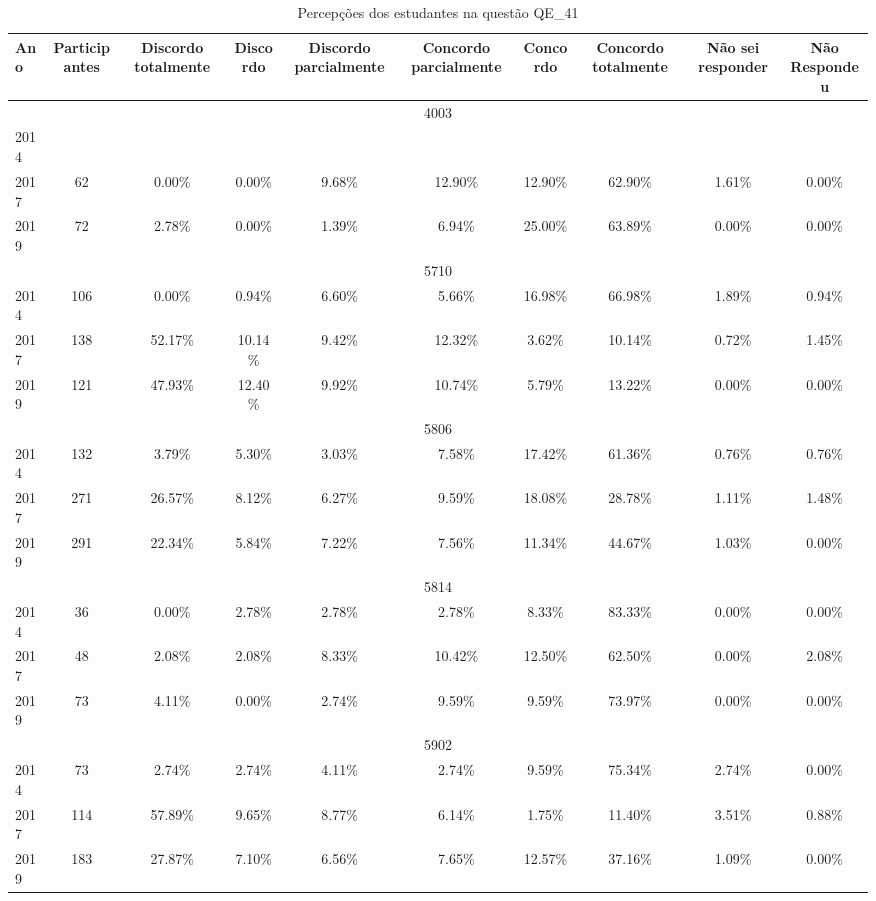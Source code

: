 \begin{table}[H]
\centering
\caption{Percepções dos estudantes na questão QE\_41}
\begin{tabular}{|l|c|ccc|ccc|cc|}
\hline
\toprule
Ano & Participantes & Discordo totalmente & Discordo & Discordo parcialmente & Concordo parcialmente & Concordo & Concordo totalmente & Não sei responder & Não Respondeu \\
\midrule
\hline
\multicolumn{10}{|c|}{4003}\\
\hline
2014 & & & & & & & & & \\
2017 & 62 & 0.00\% & 0.00\% & 9.68\% & 12.90\% & 12.90\% & 62.90\% & 1.61\% & 0.00\%\\
2019 & 72 & 2.78\% & 0.00\% & 1.39\% & 6.94\% & 25.00\% & 63.89\% & 0.00\% & 0.00\%\\
\hline
\hline
\multicolumn{10}{|c|}{5710}\\
\hline
2014 & 106 & 0.00\% & 0.94\% & 6.60\% & 5.66\% & 16.98\% & 66.98\% & 1.89\% & 0.94\%\\
2017 & 138 & 52.17\% & 10.14\% & 9.42\% & 12.32\% & 3.62\% & 10.14\% & 0.72\% & 1.45\%\\
2019 & 121 & 47.93\% & 12.40\% & 9.92\% & 10.74\% & 5.79\% & 13.22\% & 0.00\% & 0.00\%\\
\hline
\hline
\multicolumn{10}{|c|}{5806}\\
\hline
2014 & 132 & 3.79\% & 5.30\% & 3.03\% & 7.58\% & 17.42\% & 61.36\% & 0.76\% & 0.76\%\\
2017 & 271 & 26.57\% & 8.12\% & 6.27\% & 9.59\% & 18.08\% & 28.78\% & 1.11\% & 1.48\%\\
2019 & 291 & 22.34\% & 5.84\% & 7.22\% & 7.56\% & 11.34\% & 44.67\% & 1.03\% & 0.00\%\\
\hline
\hline
\multicolumn{10}{|c|}{5814}\\
\hline
2014 & 36 & 0.00\% & 2.78\% & 2.78\% & 2.78\% & 8.33\% & 83.33\% & 0.00\% & 0.00\%\\
2017 & 48 & 2.08\% & 2.08\% & 8.33\% & 10.42\% & 12.50\% & 62.50\% & 0.00\% & 2.08\%\\
2019 & 73 & 4.11\% & 0.00\% & 2.74\% & 9.59\% & 9.59\% & 73.97\% & 0.00\% & 0.00\%\\
\hline
\hline
\multicolumn{10}{|c|}{5902}\\
\hline
2014 & 73 & 2.74\% & 2.74\% & 4.11\% & 2.74\% & 9.59\% & 75.34\% & 2.74\% & 0.00\%\\
2017 & 114 & 57.89\% & 9.65\% & 8.77\% & 6.14\% & 1.75\% & 11.40\% & 3.51\% & 0.88\%\\
2019 & 183 & 27.87\% & 7.10\% & 6.56\% & 7.65\% & 12.57\% & 37.16\% & 1.09\% & 0.00\%\\

\end{tabular}
\end{table}

